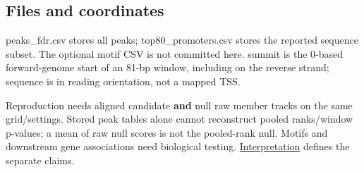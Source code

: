 \documentclass{article}
\begin{document}
\subsection{Files and coordinates}\label{files-and-coordinates}

peaks\_fdr.csv stores all peaks; top80\_\allowbreak{}promoters.csv stores the reported sequence subset. The optional motif CSV is not committed here. summit is the 0-based forward-genome start of an 81-bp window, including on the reverse strand; sequence is in reading orientation, not a mapped TSS.

Reproduction needs aligned candidate \textbf{and} null raw member tracks on the same grid/settings. Stored peak tables alone cannot reconstruct pooled ranks/window p-values; a mean of raw null scores is not the pooled-rank null. Motifs and downstream gene associations need biological testing. \href{../../../../../docs/RESULTS.md\#interpreting-candidates-and-downstream-units}{Interpretation} defines the separate claims.
\end{document}
